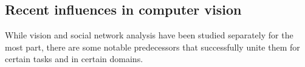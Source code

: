 


\subsection{Recent influences in computer vision}

While vision and social network analysis have been studied separately for the most part, there are some notable predecessors that successfully unite them for certain tasks and in certain domains.

